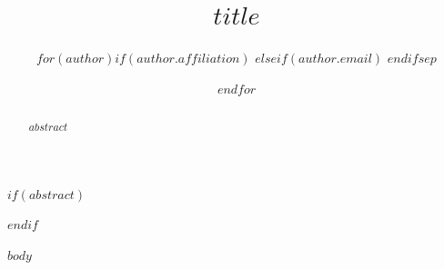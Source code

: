 \documentclass[conference,$if(papersize)$$papersize$$else$a4$endif$paper]{IEEEtran}
\title{$title$}
\author{$for(author)$\IEEEauthorblockN{$author.name$}$if(author.affiliation)$
\IEEEauthorblockA{$author.affiliation$$if(author.email)$\\ $author.email$$endif$}$elseif(author.email)$
\IEEEauthorblockA{$author.email$}$endif$$sep$
\and
$endfor$}
\begin{document}
\maketitle
$if(abstract)$
\begin{abstract}
$abstract$
\end{abstract}
$endif$

$body$
\end{document}
